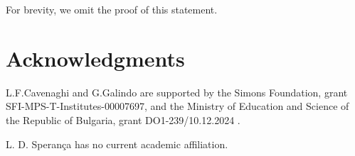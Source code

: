 \documentclass[graybox]{svmult}
\begin{document}
For brevity, we omit the proof of this statement.
%


%



\section*{Acknowledgments}
L.F.Cavenaghi and G.Galindo are supported by the Simons Foundation, grant SFI-MPS-T-Institutes-00007697, and the Ministry of Education and Science of the Republic of Bulgaria, grant DO1-239/10.12.2024 .

L. D. Sperança has no current academic affiliation.


 
\end{document}
